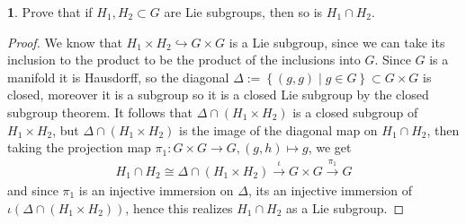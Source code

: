 \documentclass[10.5pt]{article}
\theoremstyle{definition}
\newtheorem{pb}{}
\newcommand{\set}[1]{\left\{#1\right\}}
\begin{document}
    \begin{pb} Prove that if \(H_1,H_2 \subset G\) are Lie subgroups, then so is \(H_1 \cap H_2\).
        \begin{proof}
        We know that \(H_1 \times H_2 \hookrightarrow G \times G\) is a Lie subgroup, since we can take its inclusion to the product to be the product of the inclusions into \(G\). Since \(G\) is a manifold it is Hausdorff, so the diagonal \(\Delta := \set{(g,g) \mid g \in G} \subset G \times G\) is closed, moreover it is a subgroup so it is a closed Lie subgroup by the closed subgroup theorem. It follows that \(\Delta \cap (H_1 \times H_2)\) is a closed subgroup of \(H_1 \times H_2\), but \(\Delta \cap (H_1 \times H_2) \) is the image of the diagonal map on \(H_1 \cap H_2\), then taking the projection map \(\pi_1: G \times G \to G, (g,h) \mapsto g\), we get
        \begin{align*}
            H_1 \cap H_2 \cong \Delta \cap (H_1 \times H_2) \overset{\iota}{\to} G \times G \overset{\pi_1}{\to} G
        \end{align*}
        and since \(\pi_1\) is an injective immersion on \(\Delta\), its an injective immersion of \(\iota\left(\Delta \cap (H_1 \times H_2)\right)\), hence this realizes \(H_1 \cap H_2\) as a Lie subgroup.
        \end{proof}
    \end{pb}
\end{document}
